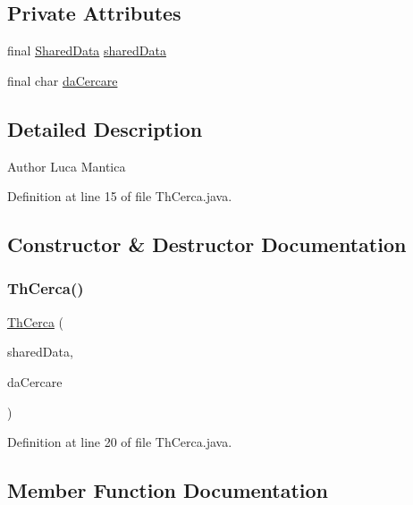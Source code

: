 \subsection*{Private Attributes}
\begin{DoxyCompactItemize}
\item 
final \mbox{\hyperlink{classmain_1_1_shared_data}{Shared\+Data}} \mbox{\hyperlink{classmain_1_1_th_cerca_ac5f1128ef8d0ba91a8214e03732e2662}{shared\+Data}}
\item 
final char \mbox{\hyperlink{classmain_1_1_th_cerca_a05008a7b42b41e8cb77230f70da26619}{da\+Cercare}}
\end{DoxyCompactItemize}


\subsection{Detailed Description}
\begin{DoxyAuthor}{Author}
Luca Mantica 
\end{DoxyAuthor}


Definition at line 15 of file Th\+Cerca.\+java.



\subsection{Constructor \& Destructor Documentation}
\mbox{\label{classmain_1_1_th_cerca_ae5572ee8b473eb1a52dfcc4c4363d731}} 
\subsubsection{\texorpdfstring{Th\+Cerca()}{ThCerca()}}
{\footnotesize\ttfamily \mbox{\hyperlink{classmain_1_1_th_cerca}{Th\+Cerca}} (\begin{DoxyParamCaption}\item[{\mbox{\hyperlink{classmain_1_1_shared_data}{Shared\+Data}}}]{shared\+Data,  }\item[{char}]{da\+Cercare }\end{DoxyParamCaption})}



Definition at line 20 of file Th\+Cerca.\+java.



\subsection{Member Function Documentation}
\mbox{\label{classmain_1_1_th_cerca_a13a43e6d814de94978c515cb084873b1}} 
